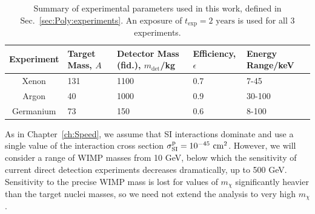 \begin{table}[t]
  \setlength{\extrarowheight}{2pt}
  \begin{center}
	\begin{tabular}{c|m{1.2cm}m{2.2cm}m{2cm}m{2.1cm}}
        \hline\hline
	Experiment  & Target Mass, $A$ & Detector Mass (fid.), $m_\textrm{det}$/kg & Efficiency, $\epsilon$ & Energy Range/keV\\
	\hline
	Xenon  & 131  & 1100 \cite{Aprile:2012a} & 0.7 \cite{Aprile:2012b} & 7-45 \cite{Aprile:2010} \\
	Argon  & 40  & 1000 & 0.9 \cite{Benetti:2007} & 30-100 \cite{Grandi:2005} \\
        Germanium  & 73  & 150 \cite{Bauer:2013b} & 0.6 \cite{Bauer:2013a} & 8-100 \cite{Bauer:2013a} \\
        \hline\hline
	\end{tabular}
  \end{center}
\caption[Parameter values used for the mock experiments used in Chapter \ref{ch:Poly}]{Summary of experimental parameters used in this work, defined in Sec.~\ref{sec:Poly:experiments}. An exposure of $t_\textrm{exp} = 2 \textrm{ years}$ is used for all 3 experiments.}
\label{tab:Poly:experiments}
\end{table}



As in Chapter~\ref{ch:Speed}, we assume that SI interactions dominate and use a single value of the interaction cross section $\sigmapsi = 10^{-45} \cmsq$. However, we will consider a range of WIMP masses from 10 GeV, below which the sensitivity of current direct detection experiments decreases dramatically, up to 500 GeV. Sensitivity to the precise WIMP mass is lost for values of $m_\chi$ significantly heavier than the target nuclei masses, so we need not extend the analysis to very high $m_\chi$.

